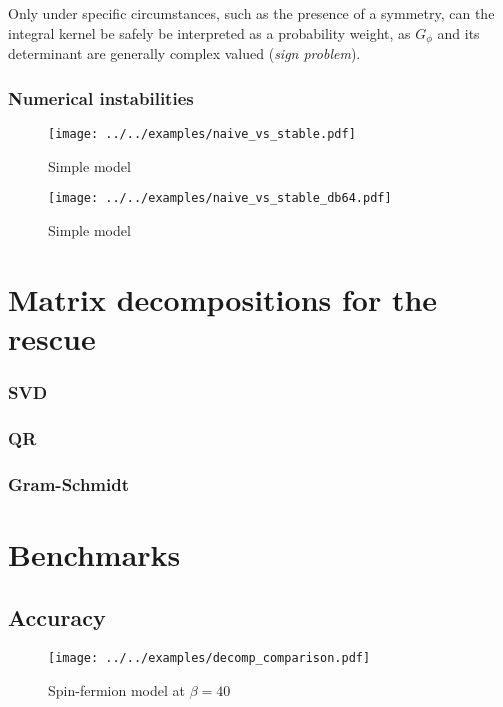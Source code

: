\documentclass[%
 reprint,
superscriptaddress,
showpacs,
 amsmath,amssymb,
 aps,
 prb,
longbibliography,
]{revtex4-1}
\begin{document}
Only under specific circumstances, such as the presence of a symmetry, can the integral kernel be safely be interpreted as a probability weight, as $G_\phi$ and its determinant are generally complex valued (\textit{sign problem}).

\subsubsection{Numerical instabilities}

\begin{figure}[h]
	\texttt{[image: ../../examples/naive\_vs\_stable.pdf]}
	\caption{Simple model \label{fig:naive_vs_stable}}
\end{figure}

\begin{figure}[h]
	\texttt{[image: ../../examples/naive\_vs\_stable\_db64.pdf]}
	\caption{Simple model \label{fig:naive_vs_stable_db64}}
\end{figure}

\section{\label{sec:decompositions}Matrix decompositions for the rescue}

\subsubsection{SVD}

\subsubsection{QR}

\subsubsection{Gram-Schmidt}


\section{Benchmarks}

\subsection{Accuracy}

\begin{figure}[h]
	\texttt{[image: ../../examples/decomp\_comparison.pdf]}
	\caption{Spin-fermion model at $\beta = 40$ \label{fig:decomp_comparison}}
\end{figure}
\end{document}
